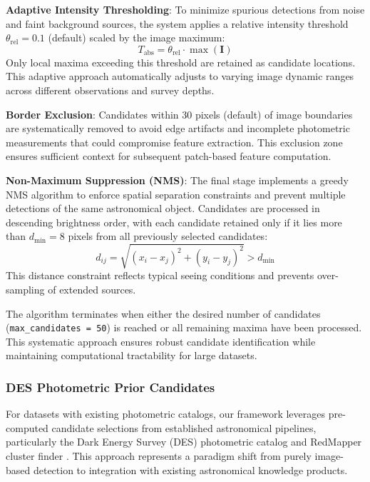 \documentclass[twocolumn,10pt]{aastex631}
\begin{document}
\textbf{Adaptive Intensity Thresholding}: To minimize spurious detections from noise and faint background sources, the system applies a relative intensity threshold $\theta_{\text{rel}} = 0.1$ (default) scaled by the image maximum:
\begin{equation}
T_{\text{abs}} = \theta_{\text{rel}} \cdot \max(\mathbf{I})
\end{equation}
Only local maxima exceeding this threshold are retained as candidate locations. This adaptive approach automatically adjusts to varying image dynamic ranges across different observations and survey depths.

\textbf{Border Exclusion}: Candidates within 30 pixels (default) of image boundaries are systematically removed to avoid edge artifacts and incomplete photometric measurements that could compromise feature extraction. This exclusion zone ensures sufficient context for subsequent patch-based feature computation.

\textbf{Non-Maximum Suppression (NMS)}: The final stage implements a greedy NMS algorithm to enforce spatial separation constraints and prevent multiple detections of the same astronomical object. Candidates are processed in descending brightness order, with each candidate retained only if it lies more than $d_{\min} = 8$ pixels from all previously selected candidates:
\begin{equation}
d_{ij} = \sqrt{(x_i - x_j)^2 + (y_i - y_j)^2} > d_{\min}
\end{equation}
This distance constraint reflects typical seeing conditions and prevents over-sampling of extended sources.

The algorithm terminates when either the desired number of candidates (\texttt{max\_candidates = 50}) is reached or all remaining maxima have been processed. This systematic approach ensures robust candidate identification while maintaining computational tractability for large datasets.

\subsubsection{DES Photometric Prior Candidates}

For datasets with existing photometric catalogs, our framework leverages pre-computed candidate selections from established astronomical pipelines, particularly the Dark Energy Survey (DES) photometric catalog and RedMapper cluster finder \citep{Rykoff2014redMaPPer,Rykoff2016}. This approach represents a paradigm shift from purely image-based detection to integration with existing astronomical knowledge products.
\end{document}
